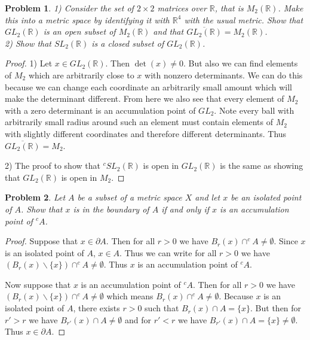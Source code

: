 \documentclass{article}
\newtheorem{problem}{Problem}
\begin{document}
\begin{flushleft}
\begin{problem}
1) Consider the set of $2 \times 2$ matrices over $\mathbb{R}$, that is $M_2(\mathbb{R})$. Make this into a metric space by identifying it with $\mathbb{R}^4$ with the usual metric. Show that $GL_2(\mathbb{R})$ is an open subset of $M_2(\mathbb{R})$ and that $\overline{GL_2(\mathbb{R})} = M_2(\mathbb{R})$.\\
2) Show that $SL_2(\mathbb{R})$ is a closed subset of $GL_2(\mathbb{R})$.
\end{problem}
\begin{proof}
1) Let $x \in GL_2(\mathbb{R})$. Then $\det (x) \neq 0$. But also we can find elements of $M_2$ which are arbitrarily close to $x$ with nonzero determinants. We can do this because we can change each coordinate an arbitrarily small amount which will make the determinant different. From here we also see that every element of $M_2$ with a zero determinant is an accumulation point of $GL_2$. Note every ball with arbitrarily small radius around such an element must contain elements of $M_2$ with slightly different coordinates and therefore different determinants. Thus $\overline{GL_2(\mathbb{R})} = M_2$.\newline

2) The proof to show that $^c SL_2(\mathbb{R})$ is open in $GL_2(\mathbb{R})$ is the same as showing that $GL_2(\mathbb{R})$ is open in $M_2$.
\end{proof}

\begin{problem}
Let $A$ be a subset of a metric space $X$ and let $x$ be an isolated point of $A$. Show that $x$ is in the boundary of $A$ if and only if $x$ is an accumulation point of $^cA$.
\end{problem}
\begin{proof}
Suppose that $x \in \partial A$. Then for all $r > 0$ we have $B_r(x) \cap ^c A \neq \emptyset$. Since $x$ is an isolated point of $A$, $x \in A$. Thus we can write for all $r > 0$ we have $(B_r(x) \backslash \{x\}) \cap ^c A \neq \emptyset$. Thus $x$ is an accumulation point of $^c A$.\newline

Now suppose that $x$ is an accumulation point of $^c A$. Then for all $r > 0$ we have $(B_r(x) \backslash \{x\}) \cap ^c A \neq \emptyset$ which means $B_r(x) \cap ^c A \neq \emptyset$. Because $x$ is an isolated point of $A$, there exists $r > 0$ such that $B_r(x) \cap A = \{x\}$. But then for $r' > r$ we have $B_{r'}(x) \cap A \neq \emptyset$ and for $r' < r$ we have $B_{r'}(x) \cap A = \{x\} \neq \emptyset$. Thus $x \in \partial A$.
\end{proof}


\end{flushleft}
\end{document}

